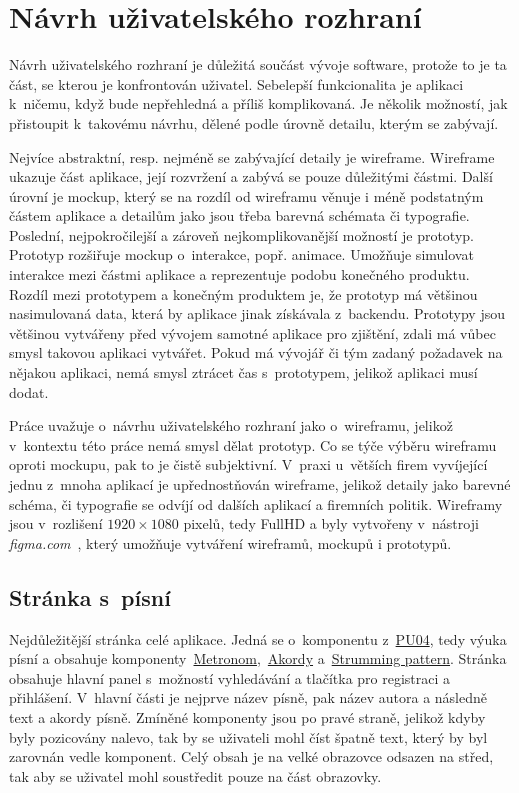 \section{Návrh uživatelského rozhraní}
\label{sc:wireframes}
Návrh uživatelského rozhraní je důležitá součást vývoje software, protože to je ta část, se kterou je konfrontován uživatel. Sebelepší funkcionalita je aplikaci k~ničemu, když bude nepřehledná a příliš komplikovaná. Je několik možností, jak přistoupit k~takovému návrhu, dělené podle úrovně detailu, kterým se zabývají.

Nejvíce abstraktní, resp. nejméně se zabývající detaily je wireframe. Wireframe ukazuje část aplikace, její rozvržení a zabývá se pouze důležitými částmi. Další úrovní je mockup, který se na rozdíl od wireframu věnuje i méně podstatným částem aplikace a detailům jako jsou třeba barevná schémata či typografie. Poslední, nejpokročilejší a zároveň nejkomplikovanější možností je prototyp. Prototyp rozšiřuje mockup o~interakce, popř. animace. Umožňuje simulovat interakce mezi částmi aplikace a reprezentuje podobu konečného produktu. Rozdíl mezi prototypem a konečným produktem je, že prototyp má většinou nasimulovaná data, která by aplikace jinak získávala z~backendu. Prototypy jsou většinou vytvářeny před vývojem samotné aplikace pro zjištění, zdali má vůbec smysl takovou aplikaci vytvářet. Pokud má vývojář či tým zadaný požadavek na nějakou aplikaci, nemá smysl ztrácet čas s~prototypem, jelikož aplikaci musí dodat.

Práce uvažuje o~návrhu uživatelského rozhraní jako o~wireframu, jelikož v~kontextu této práce nemá smysl dělat prototyp. Co se týče výběru wireframu oproti mockupu, pak to je čistě subjektivní. V~praxi u~větších firem vyvíjející jednu z~mnoha aplikací je upřednostňován wireframe, jelikož detaily jako barevné schéma, či typografie se odvíjí od dalších aplikací a firemních politik. Wireframy jsou v~rozlišení $1920 \times 1080$ pixelů, tedy FullHD a byly vytvořeny v~nástroji \emph{figma.com}~\cite{figmainc_2019_figma}, který umožňuje vytváření wireframů, mockupů i prototypů.

\subsection{Stránka s~písní}
\label{ss:wireframe_song}
Nejdůležitější stránka celé aplikace. Jedná se o~komponentu z~\hyperref[uc04]{PU04}, tedy výuka písní a obsahuje komponenty~\hyperref[uc01]{Metronom},~\hyperref[uc02]{Akordy} a~\hyperref[uc03]{Strumming pattern}. Stránka obsahuje hlavní panel s~možností vyhledávání a tlačítka pro registraci a přihlášení. V~hlavní části je nejprve název písně, pak název autora a následně text a akordy písně. Zmíněné komponenty jsou po pravé straně, jelikož kdyby byly pozicovány nalevo, tak by se uživateli mohl číst špatně text, který by byl zarovnán vedle komponent. Celý obsah je na velké obrazovce odsazen na střed, tak aby se uživatel mohl soustředit pouze na část obrazovky.

